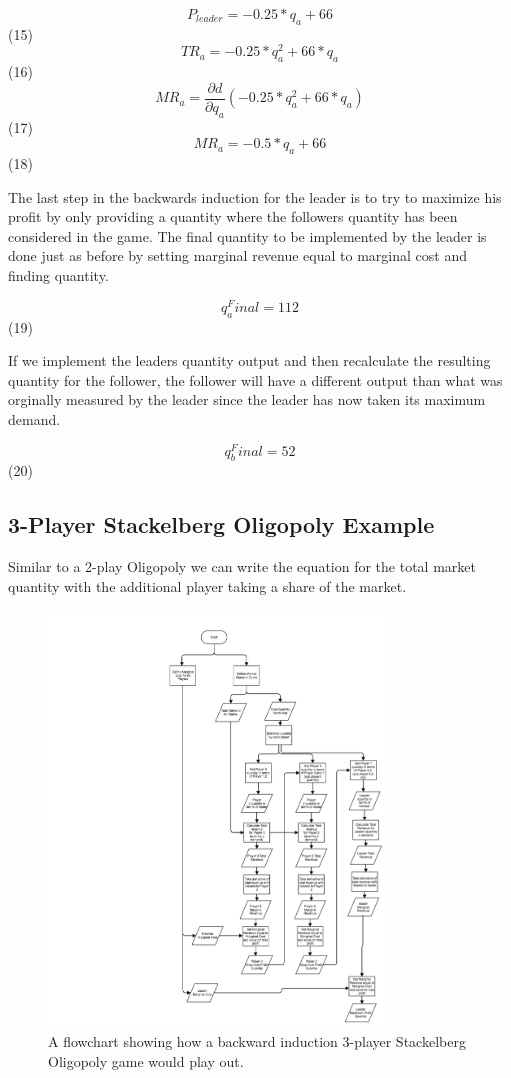 \documentclass[phd, 12pt, print]{fauthesis}
\begin{document}
$$ P_{leader} = -0.25*q_{a} + 66$$(15)
$$ TR_{a} = -0.25*q_{a}^2 + 66*q_{a}$$ (16)
$$ MR_{a} = \frac{\partial d}{\partial q_{a}}(-0.25*q_{a}^2 + 66*q_{a})$$ (17)
$$ MR_{a} = -0.5*q_{a} + 66$$ (18)

The last step in the backwards induction for the leader is to try to 
maximize his profit by only providing a quantity where the followers 
quantity has been considered in the game. The final quantity to be 
implemented by the leader is done just as before by setting marginal 
revenue equal to marginal cost and finding quantity.

$$ q_{a}^Final = 112$$ (19)

If we implement the leaders quantity output and then recalculate 
the resulting quantity for the follower, the follower will have a 
different output than what was orginally measured by the leader 
since the leader has now taken its maximum demand.

$$ q_{b}^Final = 52$$ (20)

\subsection{3-Player Stackelberg Oligopoly Example}
Similar to a 2-play Oligopoly we can write the equation for
the total market quantity with the additional player taking a 
share of the market. 

\begin{figure}[th]
  \centering
  \includegraphics[width=3.5in]{Figures/stakelberggame-3pl.png}
  \caption[A Stackelberg Game Flowchart]{A flowchart showing how a backward induction 3-player Stackelberg Oligopoly game would play out.}
  \label{fig:StackelbergGame3pl}
\end{figure}
\end{document}

